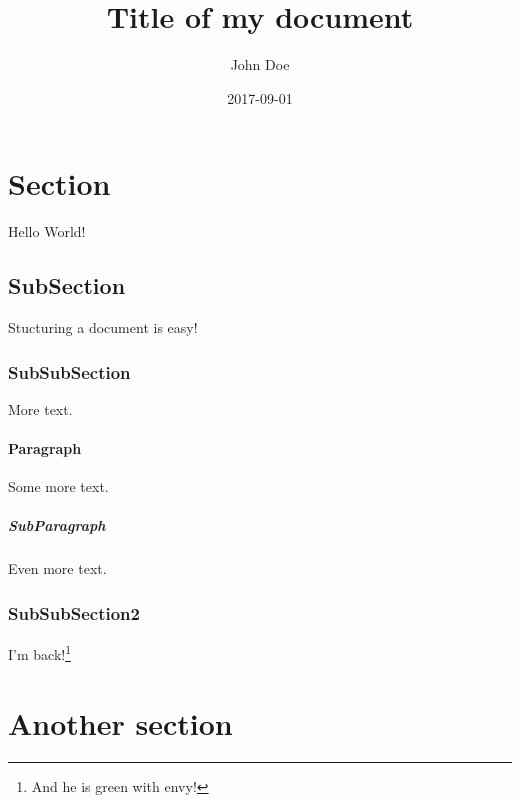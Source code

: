 \documentclass{article}
\title{Title of my document}
\date{2017-09-01}
\author{John Doe}
\begin{document}
\maketitle
\newpage
\tableofcontents
\newpage

%
\section{Section}

Hello World!

\subsection{SubSection}

Stucturing a document is easy!

\subsubsection{SubSubSection}

More text.

\paragraph{Paragraph}

Some more text.

\subparagraph{SubParagraph}

Even more text.
\subsubsection{SubSubSection2}
I'm back!\footnote{\label{myfootnote}And he is green with envy!}

\section{Another section}
\end{document}
